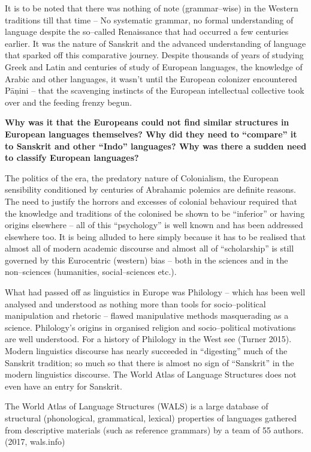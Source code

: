 \vskip 2pt

It is to be noted that there was nothing of note (grammar–wise) in the Western traditions till that time – No systematic grammar, no formal understanding of language despite the so–called Renaissance that had occurred a few centuries earlier. It was the nature of Sanskrit and the advanced understanding of language that sparked off this comparative journey. Despite thousands of years of studying Greek and Latin and centuries of study of European languages, the knowledge of Arabic and other languages, it wasn’t until the European colonizer encountered Pāņini – that the scavenging instincts of the European intellectual collective took over and the feeding frenzy begun.

\vskip 2pt

\textbf{Why was it that the Europeans could not find similar structures in European languages themselves? Why did they need to “compare” it to Sanskrit and other “Indo” languages? Why was there a sudden need to classify European languages?}

The politics of the era, the predatory nature of Colonialism, the European sensibility conditioned by centuries of Abrahamic polemics are definite reasons. The need to justify the horrors and excesses of colonial behaviour required that the knowledge and traditions of the colonised be shown to be “inferior” or having origins elsewhere – all of this “psychology” is well known and has been addressed elsewhere too. It is being alluded to here simply because it has to be realised that almost all of modern academic discourse and almost all of “scholarship” is still governed by this Eurocentric (western) bias – both in the sciences and in the non–sciences (humanities, social–sciences etc.).

What had passed off as linguistics in Europe was Philology – which has been well analysed and understood as nothing more than tools for socio–political manipulation and rhetoric – flawed manipulative methods masquerading as a science. Philology’s origins in organised religion and socio–political motivations are well understood. For a history of Philology in the West see (Turner 2015). Modern linguistics discourse has nearly succeeded in “digesting” much of the Sanskrit tradition; so much so that there is almost no sign of “Sanskrit” in the modern linguistics discourse. The World Atlas of Language Structures does not even have an entry for Sanskrit.

\begin{myquote}
The World Atlas of Language Structures (WALS) is a large database of structural (phonological, grammatical, lexical) properties of languages gathered from descriptive materials (such as reference grammars) by a team of 55 authors. (2017, wals.info)
\end{myquote}

